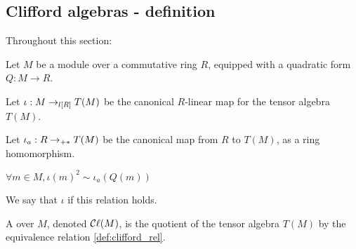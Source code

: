 \subsection{Clifford algebras - definition}
\label{sec:def}







Throughout this section:

Let $M$ be a module over a commutative ring $R$, equipped with a quadratic form $Q: M \to R$.

Let $\iota : M \lmap{R} T(M)$ be the canonical $R$-linear map for the tensor algebra $T(M)$.

Let $\iota_a : R \amap{R} T(M)$ be the canonical map from $R$ to $T(M)$, as a ring homomorphism.

\begin{definition}
  \label{def:clifford_rel}
  \leanok

  $\forall m \in M, \iota(m)^2 \sim \iota_a(Q(m))$
\end{definition}

We say that $\iota$  if this relation holds.

\begin{definition}
    \label{def:clifford_algebra}
    \leanok

    A  over $M$, denoted $\Cl (M)$, is
    the quotient of the tensor algebra $T(M)$
    by the equivalence relation \ref{def:clifford_rel}.
\end{definition}

